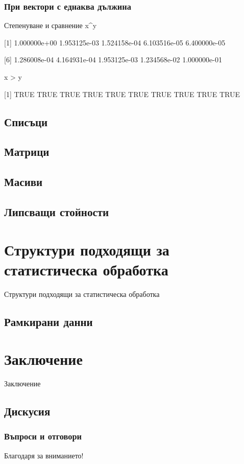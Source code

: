 \documentclass{beamer}
\begin{document}
\begin{frame}
\frametitle{При вектори с еднаква дължина}
\begin{block}{Степенуване и сравнение}
x\textasciicircum y

[1] 1.000000e+00 1.953125e-03 1.524158e-04 6.103516e-05 6.400000e-05

[6] 1.286008e-04 4.164931e-04 1.953125e-03 1.234568e-02 1.000000e-01

x > y

[1] TRUE TRUE TRUE TRUE TRUE TRUE TRUE TRUE TRUE TRUE
\end{block}
\end{frame}

\subsection{Списъци}

\subsection{Матрици}

\subsection{Масиви}

\subsection{Липсващи стойности}

\section{Структури подходящи за статистическа обработка}

\begin{frame}
\center \huge{Структури подходящи за статистическа обработка}
\end{frame}

\subsection{Рамкирани данни}

\section{Заключение}

\begin{frame}
\center \huge{Заключение}
\end{frame}

\subsection{Дискусия}

\begin{frame}
\frametitle{Въпроси и отговори}
\center \huge{Благодаря за вниманието!}
\end{frame}
\end{document}
